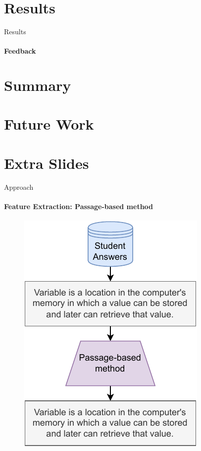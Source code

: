 \documentclass[aspectratio=169]{beamer}
\begin{document}
\section{Results}
\begin{frame}{Results}
	\framesubtitle{Feedback}
\end{frame}
\section{Summary}
\section{Future Work}
\section{Extra Slides}
\begin{frame}{Approach}
\framesubtitle{Feature Extraction: Passage-based method}
\begin{figure}
\centering
\includegraphics[scale = 0.65]{images/passage_FE.pdf}
\label{fig:passage fe}
\end{figure}
\end{frame}
\end{document}
